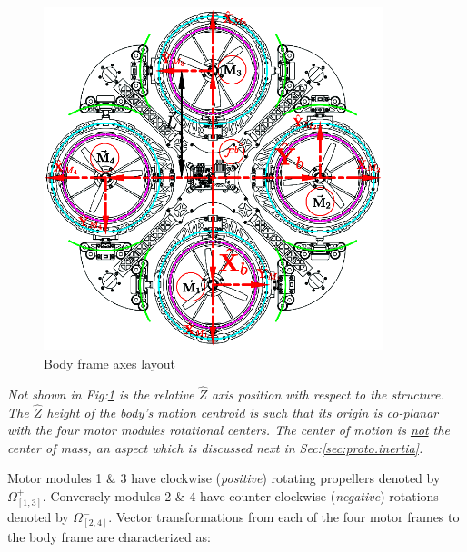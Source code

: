 \begin{figure}[htbp]
\centering
\includegraphics[width=0.88\textwidth]{figs/body-frame}
\caption{Body frame axes layout}
\vspace{-15pt}
\label{fig:body-frame}
\end{figure}
\par
\emph{\color{Gray}Not shown in Fig:\ref{fig:body-frame} is the relative $\hat{Z}$ axis position with respect to the structure. The $\hat{Z}$ height of the body's motion centroid is such that its origin is co-planar with the four motor modules rotational centers. The center of motion is \underline{not} the center of mass, an aspect which is discussed next in Sec:\ref{sec:proto.inertia}.}
\par
Motor modules 1 \& 3 have clockwise (\emph{positive}) rotating propellers denoted by $\Omega_{[1,3]}^{+}$. Conversely modules 2 \& 4 have counter-clockwise (\emph{negative}) rotations denoted by $\Omega_{[2,4]}^{-}$. Vector transformations from each of the four motor frames to the body frame are characterized as:
